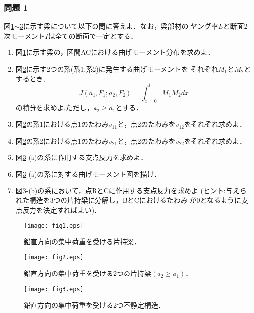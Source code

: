 \documentclass[10pt,a4j]{jarticle}
\begin{document}
\subsubsection*{問題 1}
図\ref{fig:fig1}$\sim$\ref{fig:fig3}に示す梁について以下の問に答えよ．なお，梁部材の
ヤング率$E$と断面2次モーメント$I$は全ての断面で一定とする．
\begin{enumerate}
\item
	図\ref{fig:fig1}に示す梁の，区間ACにおける曲げモーメント分布を求めよ．
\item
	図\ref{fig:fig2}に示す2つの系(系1,系2)に発生する曲げモーメントを
	それぞれ$M_1$と$M_2$とするとき,
	\begin{equation}
		J(a_1,F_1;a_2,F_2)=\int_{x=0}^{l}M_1M_2 dx
	\end{equation}
	の積分を求めよ.ただし，$a_2\geq a_1$とする．
\item
	図\ref{fig:fig2}の系1における点1のたわみ$v_{11}$と，点2のたわみを$v_{12}$をそれぞれ求めよ．
\item
	図\ref{fig:fig2}の系2における点1のたわみ$v_{21}$と，点2のたわみを$v_{22}$をそれぞれ求めよ．
\item
	図\ref{fig:fig3}-(a)の系に作用する支点反力を求めよ．
\item
	図\ref{fig:fig3}-(a)の系に対する曲げモーメント図を描け．
\item
	図\ref{fig:fig3}-(b)の系において，点BとCに作用する支点反力を求めよ
	({\small ヒント:与えられた構造を3つの片持梁に分解し，BとCにおけるたわみ
	が0となるように支点反力を決定すればよい})．
\end{enumerate}
\newpage
\begin{figure}[h]
	\begin{center}
	\texttt{[image: fig1.eps]} 
	\end{center}
	\caption{鉛直方向の集中荷重を受ける片持梁．} 
	\label{fig:fig1}
\end{figure}
\begin{figure}[h]
	\begin{center}
	\texttt{[image: fig2.eps]} 
	\end{center}
	\caption{鉛直方向の集中荷重を受ける2つの片持梁$(a_2\geq a_1)$．} 
	\label{fig:fig2}
\end{figure}
\begin{figure}[h]
	\begin{center}
	\texttt{[image: fig3.eps]} 
	\end{center}
	\caption{鉛直方向の集中荷重を受ける2つ不静定構造．} 
	\label{fig:fig3}
\end{figure}
\clearpage
\end{document}

